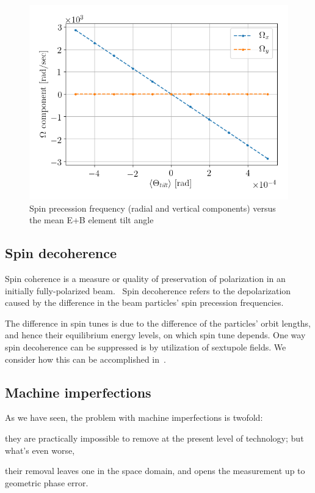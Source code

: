 \documentclass[a4paper]{jacow}
\begin{document}
\begin{figure}[h!]\centering
\includegraphics[width=\linewidth]{Figures/linearity_test_shifting_gauss_freq}
\caption{Spin precession frequency (radial and vertical components) versus
the mean E+B element tilt angle\label{fig:imperfections:SW_roll_rate}}
\end{figure}


\subsection{Spin decoherence}
Spin coherence is a measure or quality of preservation of polarization in an initially fully-polarized
beam.~\cite{Eremey:Thesis} Spin decoherence refers to the depolarization caused by the difference in the
beam particles' spin precession frequencies. 

The difference in spin tunes is due to the difference of the particles' orbit lengths, and hence their
equilibrium energy levels, on which spin tune depends. One way spin decoherence can be suppressed is by
utilization of sextupole fields. We consider how this can be accomplished in~\cite{Aksentev:IPAC19:Decoh}.

\subsection{Machine imperfections}

As we have seen, the problem with machine imperfections is twofold:
\begin{inparaenum}
\item they are practically impossible to remove at the present level of technology; but what's even worse, 
\item their removal leaves one in the space domain, and opens the measurement up to geometric phase error.
\end{inparaenum}
\end{document}
